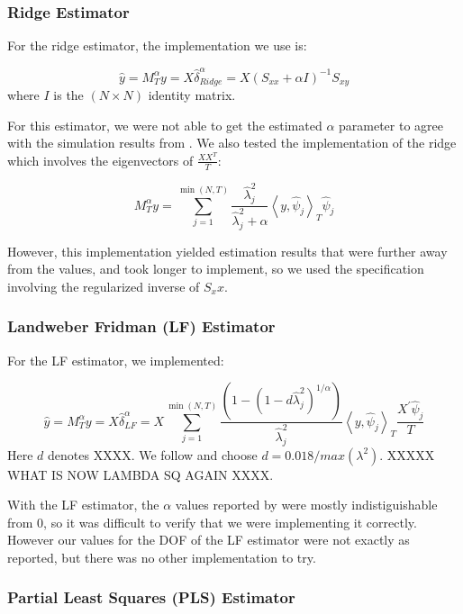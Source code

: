 \subsubsection{Ridge Estimator}

For the ridge estimator, the implementation we use is:

\[\widehat{y} = M_{T}^{\alpha} y = X \hat{\delta}_{Ridge}^{\alpha} = X (S_{xx} + \alpha I)^{-1} S_{xy}\]
where $I$ is the $(N \times N)$ identity matrix.

For this estimator, we were not able to get the estimated $\alpha$ parameter to agree with the simulation results from \citeauthor{carrasco2016sample}. We also tested the implementation of the ridge which involves the eigenvectors of $\frac{X X^{T}}{T}$:

\[M_{T}^{\alpha} y = \sum_{j=1}^{\min (N, T)} \frac{\hat{\lambda}_{j}^{2}}{\hat{\lambda}_{j}^{2}+\alpha}\left\langle y, \hat{\psi}_{j}\right\rangle_{T} \hat{\psi}_{j}\]

However, this implementation yielded estimation results that were further away from the \citeauthor{carrasco2016sample} values, and took longer to implement, so we used the specification involving the regularized inverse of $S_xx$.

\subsubsection{Landweber Fridman (LF) Estimator}

For the LF estimator, we implemented:

\[\widehat{y} = M_{T}^{\alpha} y = X \hat{\delta}_{LF}^{\alpha} = X \sum_{j=1}^{\min (N, T)} \frac{\left(1-\left(1-d \widehat{\lambda}_{j}^{2}\right)^{1 / \alpha}\right)}{\widehat{\lambda}_{j}^{2}}\left\langle y, \hat{\psi}_{j}\right\rangle_{T} \frac{X^{\prime} \hat{\psi}_{j}}{T}\]
Here $d$ denotes XXXX. We follow \citeauthor{carrasco2016sample} and choose $d = 0.018/max(\lambda^2)$. XXXXX WHAT IS NOW LAMBDA SQ AGAIN XXXX.

With the LF estimator, the $\alpha$ values reported by \citeauthor{carrasco2016sample} were mostly indistiguishable from 0, so it was difficult to verify that we were implementing it correctly. However our values for the DOF of the LF estimator were not exactly as reported, but there was no other implementation to try.

\subsubsection{Partial Least Squares (PLS) Estimator}

